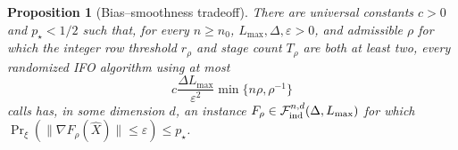 \documentclass{article}
\newtheorem{proposition}[theorem]{Proposition}
\theoremstyle{definition}
\newcommand{\proofguidespace}{\Needspace{10\baselineskip}}
\begin{document}
\proofguidespace
\begin{proposition}[Bias--smoothness tradeoff]
\label{prop:bias-smoothness-tradeoff}
There are universal constants $c>0$ and $p_\star<1/2$ such that, for every
$n\ge n_0$, $L_{\max},\Delta,\varepsilon>0$, and admissible $\rho$ for which
the integer row threshold $r_\rho$ and stage count $T_\rho$ are both at least
two, every randomized IFO algorithm using at most
\begin{equation*}
 c\frac{\Delta L_{\max}}{\varepsilon^2}
 \min\{n\rho,\rho^{-1}\}
\end{equation*}
calls has, in some dimension $d$, an instance
$F_\rho\in\mathcal F_{\rm ind}^{n,d}(\Delta,L_{\max})$ for which
$\Pr_\xi(\|\nabla F_\rho(\widehat X)\|\le\varepsilon)\le p_\star$.
\end{proposition}
\end{document}
